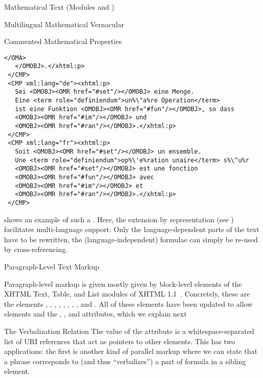 \begin{tchapter}[id=mtxt,short=Mathematical Text]{Mathematical Text (Modules
   and )}
\begin{tsection}[id=mtext]{Multilingual Mathematical Vernacular}
\begin{tsubsection}{Commented Mathematical Properties}
\begin{lstlisting}[escapechar=\%,label=lst:multiling,mathescape,
  caption={A Multilingual Group of \element{CMP} Elements},
  index={trl,xml:lang,CMP,FMP,OMOBJ}]
     </OMA>
   </OMOBJ>.</xhtml:p>
 </CMP>
 <CMP xml:lang="de"><xhtml:p>
   Sei <OMOBJ><OMR href="#set"/></OMOBJ> eine Menge. 
   Eine <term role="definiendum">un%\"a%re Operation</term> 
   ist eine Funktion <OMOBJ><OMR href="#fun"/></OMOBJ>, so dass
   <OMOBJ><OMR href="#im"/></OMOBJ> und 
   <OMOBJ><OMR href="#ran"/></OMOBJ>.</xhtml:p>
 </CMP>
 <CMP xml:lang="fr"><xhtml:p>
   Soit <OMOBJ><OMR href="#set"/></OMOBJ> un ensemble. 
   Une <term role="definiendum">op%\'e%ration unaire</term> s%\^u%r
   <OMOBJ><OMR href="#set"/></OMOBJ> est une fonction 
   <OMOBJ><OMR href="#fun"/></OMOBJ> avec 
   <OMOBJ><OMR href="#im"/></OMOBJ> et 
   <OMOBJ><OMR href="#ran"/></OMOBJ>.</xhtml:p>
 </CMP>
\end{lstlisting}

 shows an example of such a . Here,
the {\openmath} extension by {}
representation (see ) facilitates multi-language support: Only the
language-dependent parts of the text have to be rewritten, the (language-independent)
formulae can simply be re-used by cross-referencing.
\end{tsubsection}

\begin{tsubsection}[id=rt]{Paragraph-Level Text Markup}

  Paragraph-level markup is given mostly given by block-level elements of the XHTML Text,
  Table, and List modules of XHTML 1.1~\cite{McCarron:xhtmlmods1.1}. Concretely, these are
  the elements , , , ,
  , , , , and . All of
  these elements have been updated to allow  elements and the
  , , and 
  attributes, which we explain next
\end{tsubsection}

\begin{tsubsection}{The Verbalization Relation}
  The value of the  attribute is a whitespace-separated list of
  URI references that act as pointers to other \omdoc elements. This has two
  applications: the first is another kind of parallel markup where we can state that a
  phrase corresponds to (and thus ``verbalizes'') a part of formula in a sibling
   element.


\end{tsubsection}
\end{tsection}
\end{tchapter}
